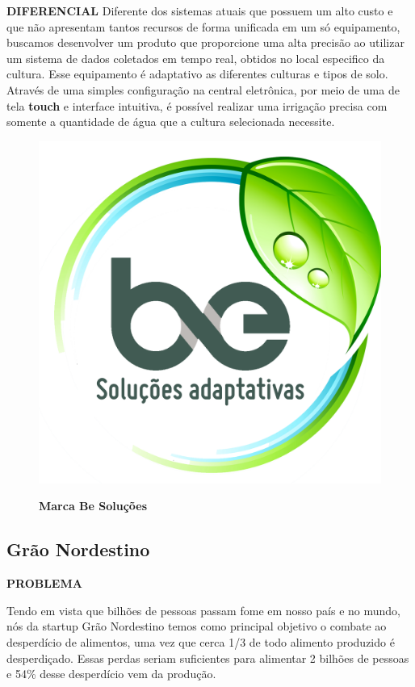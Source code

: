 \textbf{DIFERENCIAL}
Diferente dos sistemas atuais que possuem um alto custo e que não apresentam tantos recursos de forma unificada em um só equipamento, buscamos desenvolver um produto que proporcione uma alta precisão ao utilizar um sistema de dados coletados em tempo real, obtidos no local especifico da cultura. Esse equipamento é adaptativo as diferentes culturas e tipos de solo. Através de uma simples configuração na central eletrônica, por meio de uma de tela \textbf{touch} e interface intuitiva, é possível realizar uma irrigação precisa com somente a quantidade de água que a cultura selecionada necessite.

\begin{figure}[!htb]
\centering
\caption{\textbf{Marca Be Soluções}}
\includegraphics[scale=0.4]{Imagens/besolucoes.png}
\label{figura_20}
\end{figure}




\subsection{Grão Nordestino}

\textbf{PROBLEMA}

Tendo em vista que bilhões de pessoas passam fome em nosso país e no mundo, nós da startup Grão Nordestino temos como principal objetivo o combate ao desperdício de alimentos, uma vez que cerca 1/3 de todo alimento produzido é desperdiçado. Essas perdas seriam suficientes para alimentar 2 bilhões de pessoas e 54\% desse desperdício vem da produção.

